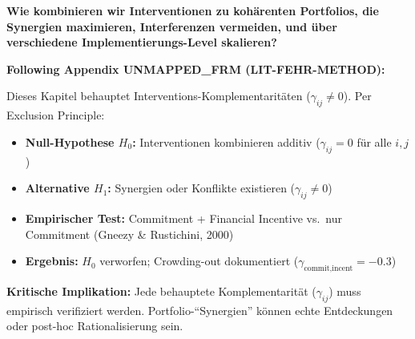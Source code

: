 
\begin{tcolorbox}[colback=red!5!white, colframe=red!75!black,
    title=Central Question]
\textbf{Wie kombinieren wir Interventionen zu kohärenten Portfolios, die Synergien maximieren, Interferenzen vermeiden, und über verschiedene Implementierungs-Level skalieren?}
\end{tcolorbox}

\begin{tcolorbox}[colback=red!5!white, colframe=red!75!black,
    title=\textbf{Methodological Note: The Exclusion Principle (Appendix UNMAPPED_FRM)}]
\textbf{Following Appendix UNMAPPED_FRM (LIT-FEHR-METHOD):}

Dieses Kapitel behauptet Interventions-Komplementaritäten ($\gamma_{ij} \neq 0$). Per Exclusion Principle:
\begin{itemize}[nosep]
    \item \textbf{Null-Hypothese $H_0$:} Interventionen kombinieren additiv ($\gamma_{ij} = 0$ für alle $i,j$)
    \item \textbf{Alternative $H_1$:} Synergien oder Konflikte existieren ($\gamma_{ij} \neq 0$)
    \item \textbf{Empirischer Test:} Commitment + Financial Incentive vs.\ nur Commitment (Gneezy \& Rustichini, 2000)
    \item \textbf{Ergebnis:} $H_0$ verworfen; Crowding-out dokumentiert ($\gamma_{\text{commit,incent}} = -0.3$)
\end{itemize}

\textbf{Kritische Implikation:} Jede behauptete Komplementarität ($\gamma_{ij}$) muss empirisch verifiziert werden. Portfolio-``Synergien'' können echte Entdeckungen oder post-hoc Rationalisierung sein.
\end{tcolorbox}


